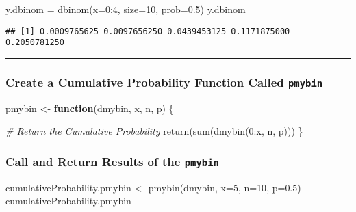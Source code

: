 \documentclass[
  12pt,
]{article}
\newenvironment{Shaded}{\begin{snugshade}}{\end{snugshade}}
\newcommand{\AttributeTok}[1]{\textcolor[rgb]{0.77,0.63,0.00}{#1}}
\newcommand{\CommentTok}[1]{\textcolor[rgb]{0.56,0.35,0.01}{\textit{#1}}}
\newcommand{\ControlFlowTok}[1]{\textcolor[rgb]{0.13,0.29,0.53}{\textbf{#1}}}
\newcommand{\DecValTok}[1]{\textcolor[rgb]{0.00,0.00,0.81}{#1}}
\newcommand{\FloatTok}[1]{\textcolor[rgb]{0.00,0.00,0.81}{#1}}
\newcommand{\FunctionTok}[1]{\textcolor[rgb]{0.00,0.00,0.00}{#1}}
\newcommand{\NormalTok}[1]{#1}
\newcommand{\OtherTok}[1]{\textcolor[rgb]{0.56,0.35,0.01}{#1}}
\newcommand{\SpecialCharTok}[1]{\textcolor[rgb]{0.00,0.00,0.00}{#1}}
\begin{document}
\begin{Shaded}
\begin{Highlighting}[]
\NormalTok{y.dbinom }\OtherTok{=} \FunctionTok{dbinom}\NormalTok{(}\AttributeTok{x=}\DecValTok{0}\SpecialCharTok{:}\DecValTok{4}\NormalTok{, }\AttributeTok{size=}\DecValTok{10}\NormalTok{, }\AttributeTok{prob=}\FloatTok{0.5}\NormalTok{)}
\NormalTok{y.dbinom}
\end{Highlighting}
\end{Shaded}

\begin{verbatim}
## [1] 0.0009765625 0.0097656250 0.0439453125 0.1171875000 0.2050781250
\end{verbatim}

\begin{center}\rule{0.5\linewidth}{0.5pt}\end{center}

\hypertarget{create-a-cumulative-probability-function-called-pmybin}{%
\subsubsection{\texorpdfstring{Create a Cumulative Probability Function
Called
\texttt{pmybin}}{Create a Cumulative Probability Function Called pmybin}}\label{create-a-cumulative-probability-function-called-pmybin}}

\begin{Shaded}
\begin{Highlighting}[]
\NormalTok{pmybin }\OtherTok{\textless{}{-}} \ControlFlowTok{function}\NormalTok{(dmybin, x, n, p) \{}
  
  \CommentTok{\# Return the Cumulative Probability}
  \FunctionTok{return}\NormalTok{(}\FunctionTok{sum}\NormalTok{(}\FunctionTok{dmybin}\NormalTok{(}\DecValTok{0}\SpecialCharTok{:}\NormalTok{x, n, p)))}
\NormalTok{\}}
\end{Highlighting}
\end{Shaded}

\hypertarget{call-and-return-results-of-the-pmybin}{%
\subsubsection{\texorpdfstring{Call and Return Results of the
\texttt{pmybin}}{Call and Return Results of the pmybin}}\label{call-and-return-results-of-the-pmybin}}

\begin{Shaded}
\begin{Highlighting}[]
\NormalTok{cumulativeProbability.pmybin }\OtherTok{\textless{}{-}} \FunctionTok{pmybin}\NormalTok{(dmybin, }\AttributeTok{x=}\DecValTok{5}\NormalTok{, }\AttributeTok{n=}\DecValTok{10}\NormalTok{, }\AttributeTok{p=}\FloatTok{0.5}\NormalTok{)}
\NormalTok{cumulativeProbability.pmybin}
\end{Highlighting}
\end{Shaded}
\end{document}
